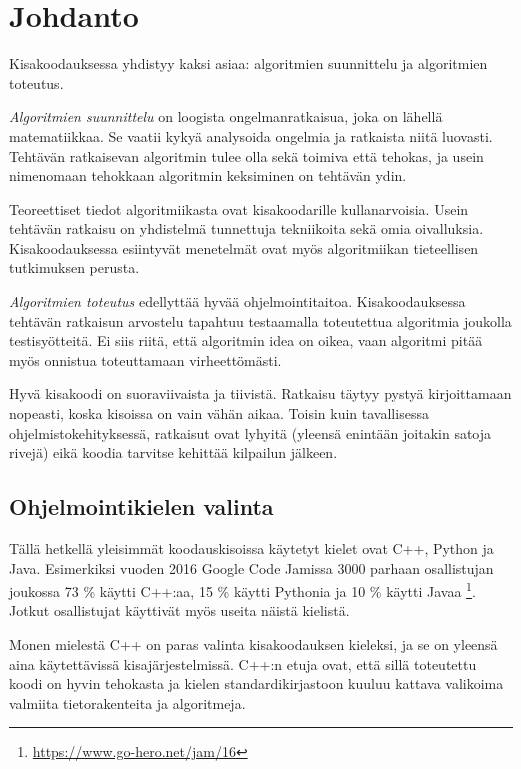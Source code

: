 \chapter{Johdanto}

Kisakoodauksessa yhdistyy kaksi asiaa:
algoritmien suunnittelu ja
algoritmien toteutus.

\textit{Algoritmien suunnittelu} on loogista ongelmanratkaisua,
joka on lähellä matematiikkaa.
Se vaatii kykyä analysoida ongelmia ja
ratkaista niitä luovasti.
Tehtävän ratkaisevan algoritmin tulee olla sekä
toimiva että tehokas,
ja usein nimenomaan tehokkaan algoritmin
keksiminen on tehtävän ydin.

Teoreettiset tiedot algoritmiikasta
ovat kisakoodarille kullanarvoisia.
Usein tehtävän ratkaisu on yhdistelmä tunnettuja
tekniikoita sekä omia oivalluksia.
Kisakoodauksessa esiintyvät menetelmät ovat myös
algoritmiikan tieteellisen tutkimuksen perusta.

\textit{Algoritmien toteutus} edellyttää hyvää ohjelmointitaitoa.
Kisakoodauksessa tehtävän ratkaisun arvostelu tapahtuu
testaamalla toteutettua algoritmia
joukolla testisyötteitä.
Ei siis riitä, että algoritmin idea on oikea,
vaan algoritmi pitää myös onnistua toteuttamaan virheettömästi.

Hyvä kisakoodi on suoraviivaista ja tiivistä.
Ratkaisu täytyy pystyä kirjoittamaan nopeasti,
koska kisoissa on vain vähän aikaa.
Toisin kuin tavallisessa ohjelmistokehityksessä,
ratkaisut ovat lyhyitä
(yleensä enintään joitakin satoja rivejä)
eikä koodia tarvitse kehittää kilpailun jälkeen.

\section{Ohjelmointikielen valinta}


Tällä hetkellä yleisimmät koodauskisoissa
käytetyt kielet ovat C++, Python ja Java.
Esimerkiksi vuoden 2016 Google Code Jamissa
3000 parhaan osallistujan joukossa
73 \% käytti C++:aa,
15 \% käytti Pythonia ja
10 \% käytti Javaa \footnote{\url{https://www.go-hero.net/jam/16}}.
Jotkut osallistujat käyttivät myös useita näistä kielistä.

Monen mielestä C++ on paras
valinta kisakoodauksen kieleksi,
ja se on yleensä aina käytettävissä
kisajärjestelmissä.
C++:n etuja ovat, että sillä
toteutettu koodi on hyvin tehokasta
ja kielen standardikirjastoon
kuuluu kattava valikoima valmiita
tietorakenteita ja algoritmeja.

